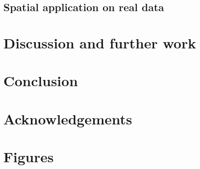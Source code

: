 \documentclass[authoryear,preprint,review,10pt]{elsarticle}
\begin{document}
\subsection{Spatial application on real data}

\section{Discussion and further work}

\section{Conclusion}


\section{Acknowledgements}




\newpage

\section*{Figures}


\end{document}
